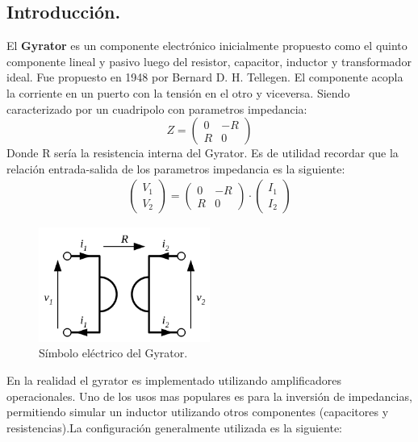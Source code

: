
%
%


\subsection{Introducción.}
El \textbf{Gyrator} es un componente electrónico inicialmente propuesto como el quinto componente lineal y pasivo luego del resistor, capacitor, inductor y transformador ideal. Fue propuesto en 1948 por Bernard D. H. Tellegen. El componente acopla la  corriente en un puerto con la tensión en el otro y viceversa. Siendo caracterizado por un cuadripolo con parametros impedancia:
$$ Z= \left(\begin{matrix}0&-R\\R&0\end{matrix}\right) $$
Donde R sería la resistencia interna del Gyrator.
Es de utilidad recordar que la relación entrada-salida de los parametros impedancia es la siguiente:
\begin{align} \left(\begin{matrix}V_1\\V_2\end{matrix}\right) =   \left(\begin{matrix}0&-R\\R&0\end{matrix}\right)  \cdot \left(\begin{matrix}I_1\\I_2\end{matrix}\right) \end{align}
\begin{figure}[H]	
	\centering
	\includegraphics[width=0.5\textwidth]{ImagenesEj2/gyratorsimb.png}
	\caption{Símbolo eléctrico del Gyrator.}
	\label{fig:gyrsimb}
\end{figure}
En la realidad el gyrator es implementado utilizando amplificadores operacionales. Uno de los usos mas populares es para la inversión de impedancias, permitiendo simular un inductor utilizando otros componentes (capacitores y resistencias).La configuración generalmente utilizada es la siguiente:
